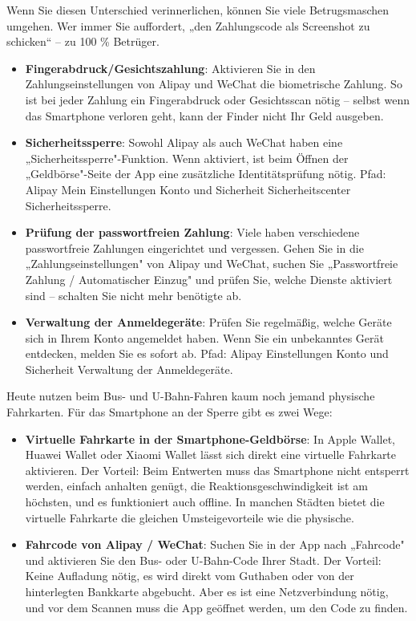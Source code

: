 Wenn Sie diesen Unterschied verinnerlichen, können Sie viele Betrugsmaschen umgehen. Wer immer Sie auffordert, „den Zahlungscode als Screenshot zu schicken“ – zu 100 \% Betrüger.


\begin{itemize}
  \item \textbf{Fingerabdruck/Gesichtszahlung}: Aktivieren Sie in den Zahlungseinstellungen von Alipay und WeChat die biometrische Zahlung. So ist bei jeder Zahlung ein Fingerabdruck oder Gesichtsscan nötig – selbst wenn das Smartphone verloren geht, kann der Finder nicht Ihr Geld ausgeben.
  \item \textbf{Sicherheitssperre}: Sowohl Alipay als auch WeChat haben eine „Sicherheitssperre"-Funktion. Wenn aktiviert, ist beim Öffnen der „Geldbörse"-Seite der App eine zusätzliche Identitätsprüfung nötig. Pfad: Alipay Mein Einstellungen Konto und Sicherheit Sicherheitscenter Sicherheitssperre.
  \item \textbf{Prüfung der passwortfreien Zahlung}: Viele haben verschiedene passwortfreie Zahlungen eingerichtet und vergessen. Gehen Sie in die „Zahlungseinstellungen" von Alipay und WeChat, suchen Sie „Passwortfreie Zahlung / Automatischer Einzug" und prüfen Sie, welche Dienste aktiviert sind – schalten Sie nicht mehr benötigte ab.
  \item \textbf{Verwaltung der Anmeldegeräte}: Prüfen Sie regelmäßig, welche Geräte sich in Ihrem Konto angemeldet haben. Wenn Sie ein unbekanntes Gerät entdecken, melden Sie es sofort ab. Pfad: Alipay Einstellungen Konto und Sicherheit Verwaltung der Anmeldegeräte.
\end{itemize}


Heute nutzen beim Bus- und U-Bahn-Fahren kaum noch jemand physische Fahrkarten. Für das Smartphone an der Sperre gibt es zwei Wege:

\begin{itemize}
  \item \textbf{Virtuelle Fahrkarte in der Smartphone-Geldbörse}: In Apple Wallet, Huawei Wallet oder Xiaomi Wallet lässt sich direkt eine virtuelle Fahrkarte aktivieren. Der Vorteil: Beim Entwerten muss das Smartphone nicht entsperrt werden, einfach anhalten genügt, die Reaktionsgeschwindigkeit ist am höchsten, und es funktioniert auch offline. In manchen Städten bietet die virtuelle Fahrkarte die gleichen Umsteigevorteile wie die physische.
  \item \textbf{Fahrcode von Alipay / WeChat}: Suchen Sie in der App nach „Fahrcode" und aktivieren Sie den Bus- oder U-Bahn-Code Ihrer Stadt. Der Vorteil: Keine Aufladung nötig, es wird direkt vom Guthaben oder von der hinterlegten Bankkarte abgebucht. Aber es ist eine Netzverbindung nötig, und vor dem Scannen muss die App geöffnet werden, um den Code zu finden.
\end{itemize}

